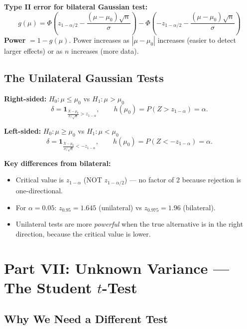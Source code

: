 \documentclass[11pt,a4paper]{article}
\begin{document}
\begin{tcolorbox}[formulabox]
\textbf{Type II error for bilateral Gaussian test:}
\[
  g(\mu) = \Phi\!\left(z_{1-\alpha/2} - \frac{(\mu-\mu_0)\sqrt{n}}{\sigma}\right) - \Phi\!\left(-z_{1-\alpha/2} - \frac{(\mu-\mu_0)\sqrt{n}}{\sigma}\right)
\]
\textbf{Power} $= 1-g(\mu)$. Power increases as $|\mu-\mu_0|$ increases (easier to detect larger effects) or as $n$ increases (more data).
\end{tcolorbox}

\subsection{The Unilateral Gaussian Tests}

\begin{tcolorbox}[formulabox]
\textbf{Right-sided:} $H_0:\mu\leq\mu_0$ vs $H_1:\mu>\mu_0$
\[
  \delta = \mathbf{1}_{\frac{\overline{X}-\mu_0}{\sigma/\sqrt{n}} > z_{1-\alpha}}, \qquad
  h(\mu_0) = P(Z>z_{1-\alpha}) = \alpha.
\]

\medskip
\textbf{Left-sided:} $H_0:\mu\geq\mu_0$ vs $H_1:\mu<\mu_0$
\[
  \delta = \mathbf{1}_{\frac{\overline{X}-\mu_0}{\sigma/\sqrt{n}} < -z_{1-\alpha}}, \qquad
  h(\mu_0) = P(Z<-z_{1-\alpha}) = \alpha.
\]
\end{tcolorbox}

\textbf{Key differences from bilateral:}
\begin{itemize}
  \item Critical value is $z_{1-\alpha}$ (NOT $z_{1-\alpha/2}$) --- no factor of 2 because rejection is one-directional.
  \item For $\alpha=0.05$: $z_{0.95}=1.645$ (unilateral) vs $z_{0.975}=1.96$ (bilateral).
  \item Unilateral tests are more \emph{powerful} when the true alternative is in the right direction, because the critical value is lower.
\end{itemize}

\section{Part VII: Unknown Variance --- The Student $t$-Test}

\subsection{Why We Need a Different Test}
\end{document}
